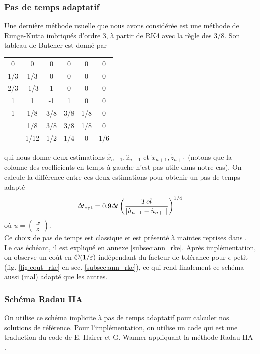 \subsubsection{Pas de temps adaptatif}

Une dernière méthode usuelle que nous avons considérée est une méthode de Runge-Kutta imbriqués d'ordre 3, à partir de RK4 avec la règle des 3/8. Son tableau de Butcher est donné par 
\begin{center}
\begin{tabular}{c|ccccc}
 0  &  0   &  0  &  0  &  0  &  0  \\
1/3 & 1/3  &  0  &  0  &  0  &  0  \\
2/3 & -1/3 &  1  &  0  &  0  &  0  \\
 1  &  1   & -1  &  1  &  0  &  0  \\
 1  & 1/8  & 3/8 & 3/8 & 1/8 &  0  \\ \hline
    & 1/8  & 3/8 & 3/8 & 1/8 &  0  \\ 
    & 1/12 & 1/2 & 1/4 &  0  & 1/6
\end{tabular}
\end{center}
qui nous donne deux estimations $\hat{x}_{n+1},\hat{z}_{n+1}$ et $\tilde{x}_{n+1},\tilde{z}_{n+1}$ (notons que la colonne des coefficients en temps à gauche n'est pas utile dans notre cas). On calcule la différence entre ces deux estimations pour obtenir un pas de temps adapté  
$$ \Delta\!\!\!\ t_{\text{opt}} = 0.9 \Delta\!\!\!\ t \left(\dfrac{Tol}{|\hat{u}_{n+1}-\tilde{u}_{n+1}|}\right)^{1/4} $$
où $u = \begin{pmatrix} x \\ z \end{pmatrix}$. \\

Ce choix de pas de temps est classique et est présenté à maintes reprises dans \cite{hairer1991}. 
Le cas échéant, il est expliqué en annexe \ref{subsec:ann_rke}. 
Après implémentation, on observe un coût en $\mathcal{O}(1/\varepsilon)$ indépendant du facteur de tolérance pour $\epsilon$ petit (fig. \ref{fig:cout_rke} en sec. \ref{subsec:ann_rke}), ce qui rend finalement ce schéma aussi (mal) adapté que les autres. 


\subsubsection{Schéma Radau IIA}
On utilise ce schéma implicite à pas de temps adaptatif pour calculer nos solutions de référence. 
Pour l'implémentation, on utilise un code  \cite{codeRADAU} qui est une traduction du code  de E. Hairer et G. Wanner appliquant la méthode Radau IIA \cite[\textit{sec}.~IV.5]{hairer1991}.

